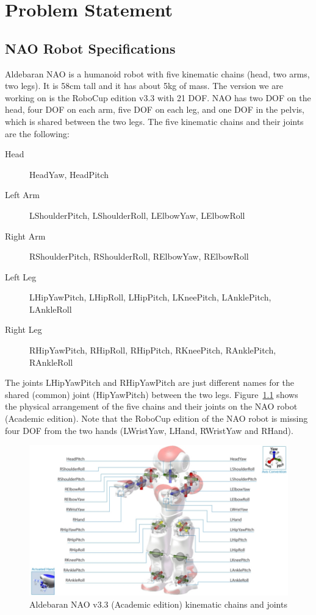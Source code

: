 
\chapter{Problem Statement}
\label{problem}

\section{NAO Robot Specifications}
Aldebaran NAO is a humanoid robot with five kinematic chains (head, two arms, two legs). It is 58cm tall and it has about 5kg of mass. The version we are working on is the RoboCup edition v3.3 with 21 DOF. NAO has two DOF on the head, four DOF on each arm, five DOF on each leg, and one DOF in the pelvis, which is shared between the two legs. The five kinematic chains and their joints are the following:
\begin{description}
\item[Head] HeadYaw, HeadPitch
\item[Left Arm] LShoulderPitch, LShoulderRoll, LElbowYaw, LElbowRoll
\item[Right Arm] RShoulderPitch, RShoulderRoll, RElbowYaw, RElbowRoll
\item[Left Leg] LHipYawPitch, LHipRoll, LHipPitch, LKneePitch, LAnklePitch, LAnkleRoll
\item[Right Leg] RHipYawPitch, RHipRoll, RHipPitch, RKneePitch, RAnklePitch, RAnkleRoll
\end{description}
The joints LHipYawPitch and RHipYawPitch are just different names for the shared (common) joint (HipYawPitch) between the two legs. Figure~\ref{fig:NAO} shows the physical arrangement of the five chains and their joints on the NAO robot (Academic edition). Note that the RoboCup edition of the NAO robot is missing four DOF from the two hands (LWristYaw, LHand, RWristYaw and RHand).

\begin{figure}[t!]
\begin{center}
\includegraphics[width=\textwidth]{Figures/nao-robot-dof.jpeg}
\caption{Aldebaran NAO v3.3 (Academic edition) kinematic chains and joints}
\label{fig:NAO}
\end{center}
\end{figure}

